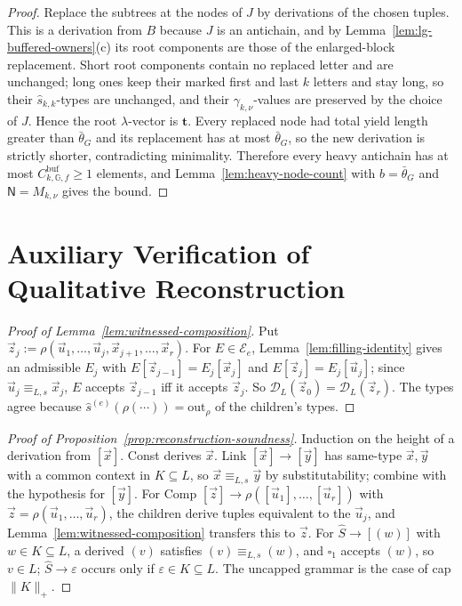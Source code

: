 \documentclass[11pt]{article}
\numberwithin{equation}{section}
\theoremstyle{plain}
\theoremstyle{definition}
\theoremstyle{remark}
\newcommand{\D}{\mathcal{D}}
\newcommand{\out}{\mathrm{out}}
\newcommand{\tuple}[1]{\vec{#1}}
\newcommand{\blank}{\square}
\newcommand{\eps}{\varepsilon}
\begin{document}
\begin{proof}
Replace the subtrees at the nodes of $J$ by derivations of the chosen tuples.
This is a derivation from $B$ because $J$ is an antichain, and by
Lemma~\ref{lem:lg-buffered-owners}(c) its root components are those of the
enlarged-block replacement.  Short root components contain no replaced letter
and are unchanged; long ones keep their marked first and last $k$ letters and
stay long, so their $\widehat s_{k,k}$-types are unchanged, and their
$\gamma_{k,\nu}$-values are preserved by the choice of $J$.  Hence the root
$\lambda$-vector is $\mathbf t$.  Every replaced node had total yield length
greater than $\bar\theta_G$ and its replacement has at most $\bar\theta_G$, so the
new derivation is strictly shorter, contradicting minimality.  Therefore every
heavy antichain has at most $C^{\mathrm{buf}}_{k,{\mathbb G},f}\ge1$ elements, and
Lemma~\ref{lem:heavy-node-count} with $b=\bar\theta_G$ and $\mathsf N=M_{k,\nu}$ gives
the bound.
\end{proof}

\section{Auxiliary Verification of Qualitative Reconstruction}
\label{app:qualitative-construction-details}

\begin{proof}[Proof of Lemma~\ref{lem:witnessed-composition}]
Put $\tuple z_j:=\rho(\tuple u_1,\ldots,\tuple u_j,\tuple x_{j+1},\ldots,\tuple x_r)$.
For $E\in\mathcal E_e$, Lemma~\ref{lem:filling-identity} gives an admissible $E_j$ with
$E[\tuple z_{j-1}]=E_j[\tuple x_j]$ and $E[\tuple z_j]=E_j[\tuple u_j]$; since
$\tuple u_j\equiv_{L,s}\tuple x_j$, $E$ accepts $\tuple z_{j-1}$ iff it accepts
$\tuple z_j$.  So $\D_L(\tuple z_0)=\D_L(\tuple z_r)$.  The types agree because
$\widehat s^{(e)}(\rho(\cdots))=\out_\rho$ of the children's types.
\end{proof}

\begin{proof}[Proof of Proposition~\ref{prop:reconstruction-soundness}]
Induction on the height of a derivation from $[\tuple x]$.  Const derives $\tuple x$.
Link $[\tuple x]\to[\tuple y]$ has same-type $\tuple x,\tuple y$ with a common context
in $K\subseteq L$, so $\tuple x\equiv_{L,s}\tuple y$ by substitutability; combine with
the hypothesis for $[\tuple y]$.  For Comp
$[\tuple z]\to\rho([\tuple u_1],\ldots,[\tuple u_r])$ with $\tuple z=\rho(\tuple u_1,
\ldots,\tuple u_r)$, the children derive tuples equivalent to the $\tuple u_j$, and
Lemma~\ref{lem:witnessed-composition} transfers this to $\tuple z$.  For
$\widehat S\to[(w)]$ with $w\in K\subseteq L$, a derived $(v)$ satisfies
$(v)\equiv_{L,s}(w)$, and $\blank_1$ accepts $(w)$, so $v\in L$; $\widehat S\to\eps$ occurs
only if $\eps\in K\subseteq L$.  The uncapped grammar is the case of cap $\|K\|_+$.
\end{proof}
\end{document}
